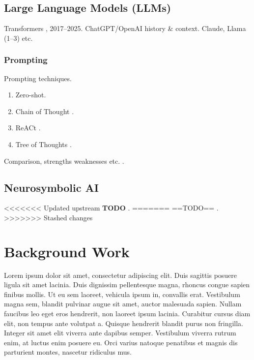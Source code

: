\documentclass[
  a4paper,
  DIV=11,
  numbers=noendperiod]{scrreprt}
\providecommand{\tightlist}{%
  \setlength{\itemsep}{0pt}\setlength{\parskip}{0pt}}
\begin{document}
\section{Large Language Models (LLMs)}\label{large-language-models-llms}

Transformers \autocite{vaswani2023}, 2017--2025. ChatGPT/OpenAI history
\& context. Claude, Llama (1--3) etc.

\subsection{Prompting}\label{prompting}

Prompting techniques.

\begin{enumerate}
\def\labelenumi{\arabic{enumi}.}
\tightlist
\item
  Zero-shot.
\item
  Chain of Thought \autocite{chainofthought}.
\item
  ReACt \autocite{reAct}.
\item
  Tree of Thoughts \autocite{yao2023}.
\end{enumerate}

Comparison, strengths weaknesses etc. \autocite{laban2025}.

\section{Neurosymbolic AI}\label{neurosymbolic-ai}

\textless\textless\textless\textless\textless\textless\textless{}
Updated upstream \textbf{TODO}
\autocite{ganguly2024,garcez2020,gaur2023,grov2024,sheth2023,tilwani2024}.
======= ==TODO==
\autocite{ganguly2024,garcez2020,gaur2023,grov2024,sheth2023,tilwani2024}.
\textgreater\textgreater\textgreater\textgreater\textgreater\textgreater\textgreater{}
Stashed changes


\chapter{Background Work}\label{background-work}

Lorem ipsum dolor sit amet, consectetur adipiscing elit. Duis sagittis
posuere ligula sit amet lacinia. Duis dignissim pellentesque magna,
rhoncus congue sapien finibus mollis. Ut eu sem laoreet, vehicula ipsum
in, convallis erat. Vestibulum magna sem, blandit pulvinar augue sit
amet, auctor malesuada sapien. Nullam faucibus leo eget eros hendrerit,
non laoreet ipsum lacinia. Curabitur cursus diam elit, non tempus ante
volutpat a. Quisque hendrerit blandit purus non fringilla. Integer sit
amet elit viverra ante dapibus semper. Vestibulum viverra rutrum enim,
at luctus enim posuere eu. Orci varius natoque penatibus et magnis dis
parturient montes, nascetur ridiculus mus.
\end{document}

